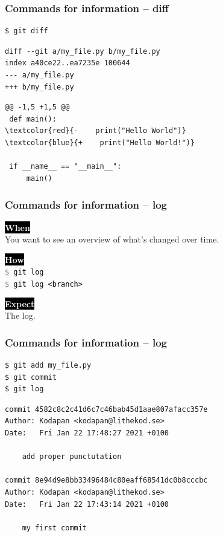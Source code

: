 \documentclass{beamer}
\newcommand{\keyword}[1]{\hspace{-1.0em}\colorbox{black}{\textcolor{white}{\textbf{#1}\vphantom{Ep}}}\vspace{0.2em}} %
\newcommand{\command}[1]{\colorbox{black!90!white!10!}{\vphantom{Ep}\texttt{\textcolor{gray}{\$} \textcolor{black}{#1}}}}
\begin{document}
\begin{frame}[fragile]
  \frametitle{Commands for information -- diff}

\begin{verbatim}
$ git diff
\end{verbatim}
\pause{}
\vspace{-2.4ex}
{
\color{gray}
\begin{Verbatim}[commandchars=\\\{\}]
diff --git a/my_file.py b/my_file.py
index a40ce22..ea7235e 100644
--- a/my_file.py
+++ b/my_file.py
\end{Verbatim}
}
\pause{}
\begin{Verbatim}[commandchars=\\\{\}]
@@ -1,5 +1,5 @@
 def main():
\textcolor{red}{-    print("Hello World")}
\textcolor{blue}{+    print("Hello World!")}
 
 if __name__ == "__main__":
     main()
\end{Verbatim}
\end{frame}

\begin{frame}
  \frametitle{Commands for information -- log}

  \keyword{When}\\
  You want to see an overview of what's changed over time.
  \vspace{0.5em}

  \keyword{How}\\
  \command{git log} \\
  \command{git log <branch>}
  \vspace{0.5em}

  \keyword{Expect}\\
  The log.
\end{frame}

\begin{frame}[fragile]
  \frametitle{Commands for information -- log}
\begin{Verbatim}
$ git add my_file.py
$ git commit
$ git log
\end{Verbatim}
\pause{}
\vspace{-1.2ex} %
\begin{Verbatim}
commit 4582c8c2c41d6c7c46bab45d1aae807afacc357e
Author: Kodapan <kodapan@lithekod.se>
Date:   Fri Jan 22 17:48:27 2021 +0100

    add proper punctutation

commit 8e94d9e8bb33496484c80eaff68541dc0b8cccbc
Author: Kodapan <kodapan@lithekod.se>
Date:   Fri Jan 22 17:43:14 2021 +0100

    my first commit
\end{Verbatim}
\end{frame}
\end{document}
